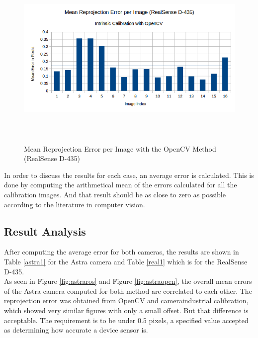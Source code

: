 \begin{figure}[!h]
\begin{center}
\includegraphics[width=5in, height=3.5in]{figures05/int/opencv_int_cal_real.png}
\caption{Mean Reprojection Error per Image with the OpenCV Method (RealSense D-435)}%
\label{fig:realopen}
\end{center}
\end{figure}

In order to discuss the results for each case, an average error is calculated. This is done by computing the arithmetical mean of the errors calculated for all the calibration images. And that result should be as close to zero as possible according to the literature in computer vision.

\subsection{Result Analysis}
After computing the average error for both cameras, the results are shown in Table \ref{astra1} for the Astra camera and Table \ref{real1} which is for the RealSense D-435.\\
 As seen in Figure \ref{fig:astraros} and Figure \ref{fig:astraopen}, the overall mean errors of the Astra camera computed for both method are correlated to each other. The reprojection error was obtained from OpenCV and camera\textunderscore industrial calibration, which showed very similar figures with only a small offset. But that difference is acceptable. The requirement is to be under 0.5 pixels, a specified value accepted as determining how accurate a device sensor is. \\
 
